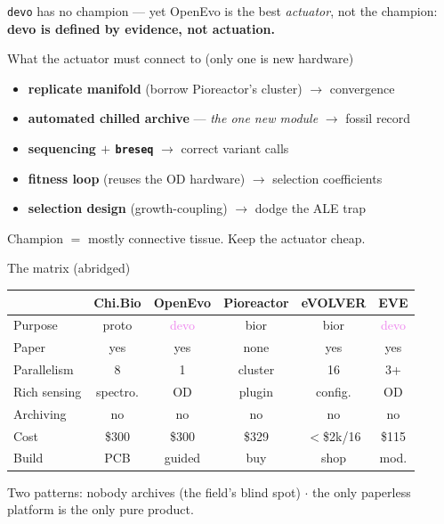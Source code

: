 \documentclass[aspectratio=169,11pt]{beamer}
\newcommand{\gd}[1]{\textcolor{good}{#1}}
\newcommand{\bd}[1]{\textcolor{bad}{#1}}
\newcommand{\wn}[1]{\textcolor{warn}{#1}}
\newcommand{\ac}[1]{\textcolor{accent}{\textbf{#1}}}
\begin{document}
\begin{frame}{\texttt{devo} has no champion --- yet}
  OpenEvo is the best \emph{actuator}, not the champion: \ac{devo is defined by evidence, not actuation.}
  \vspace{0.3em}
  \begin{block}{What the actuator must connect to (only one is new hardware)}
  \begin{itemize}\small
    \item \textbf{replicate manifold} (borrow Pioreactor's cluster) $\to$ convergence
    \item \textbf{automated chilled archive} --- \emph{the one new module} $\to$ fossil record
    \item \textbf{sequencing $+$ \texttt{breseq}} $\to$ correct variant calls
    \item \textbf{fitness loop} (reuses the OD hardware) $\to$ selection coefficients
    \item \textbf{selection design} (growth-coupling) $\to$ dodge the ALE trap
  \end{itemize}
  \end{block}
  \begin{center}\small Champion $=$ mostly connective tissue. Keep the actuator cheap.\end{center}
\end{frame}

\begin{frame}{The matrix (abridged)}
  \small
  \renewcommand{\arraystretch}{1.2}
  \begin{center}
  \begin{tabular}{@{}lccccc@{}}
    \toprule
    & \textbf{Chi.Bio} & \textbf{OpenEvo} & \textbf{Pioreactor} & \textbf{eVOLVER} & \textbf{EVE} \\
    \midrule
    Purpose      & \textcolor{accent}{proto} & \textcolor{violet}{devo} & \textcolor{warn}{bior} & \textcolor{warn}{bior} & \textcolor{violet}{devo} \\
    Paper        & \gd{yes} & \gd{yes} & \bd{none} & \gd{yes} & \gd{yes} \\
    Parallelism  & \gd{8} & \bd{1} & \gd{cluster} & \gd{16} & 3+ \\
    Rich sensing & \gd{spectro.} & \bd{OD} & plugin & config. & \bd{OD} \\
    Archiving    & \bd{no} & \bd{no} & \bd{no} & \bd{no} & \bd{no} \\
    Cost         & \$300 & \$300 & \$329 & \wn{$<$\$2k/16} & \gd{\$115} \\
    Build        & \wn{PCB} & \gd{guided} & \gd{buy} & \bd{shop} & mod. \\
    \bottomrule
  \end{tabular}
  \end{center}
  \vspace{0.6em}
  Two patterns: \bd{nobody archives} (the field's blind spot) $\cdot$
  the only paperless platform is the only pure product.
\end{frame}
\end{document}
